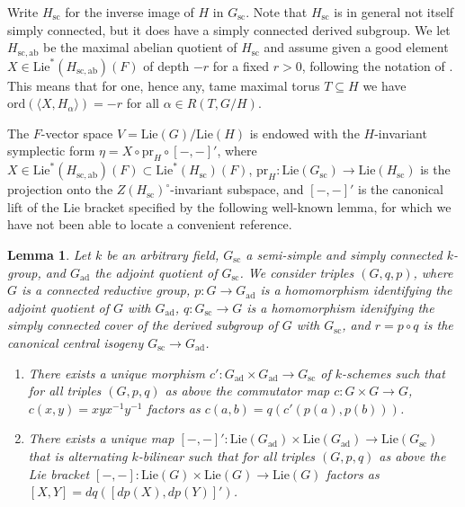 \documentclass{article}
\def\tx#1{\textrm{#1}}
\def\<{\langle}
\def\>{\rangle}
\newtheorem{lem}[thm]{Lemma}
\theoremstyle{definition}
\numberwithin{equation}{subsection}
\renewcommand{\-}{\hyp{}}
\begin{document}
Write $H_\mathrm{sc}$ for the inverse image of $H$ in $G_\tx{sc}$. Note that $H_\mathrm{sc}$ is in general not itself simply connected, but it does have a simply connected derived subgroup. We let $H_\mathrm{sc,ab}$ be the maximal abelian quotient of $H_\tx{sc}$ and assume given a good element $X \in \mathrm{Lie}^*(H_\mathrm{sc,ab})(F)$ of depth $-r$ for a fixed $r>0$, following the notation of \cite[\S3]{FKS23}. This means that for one, hence any, tame maximal torus $T \subseteq H$ we have $\tx{ord}(\<X,H_\alpha\>)=-r$ for all $\alpha \in R(T,G/H)$.

The $F$-vector space $V=\tx{Lie}(G)/\tx{Lie}(H)$ is endowed with the $H$-invariant symplectic form $\eta = X \circ \tx{pr}_H \circ [-,-]'$, where $X \in \mathrm{Lie}^*(H_\mathrm{sc,ab})(F) \subset \mathrm{Lie}^*(H_\mathrm{sc})(F)$, $\tx{pr}_H : \mathrm{Lie}(G_\mathrm{sc}) \to \mathrm{Lie}(H_\mathrm{sc})$ is the projection onto the $Z(H_\tx{sc})^\circ$-invariant subspace, and $[-,-]'$ is the canonical lift of the Lie bracket specified by the following  well-known lemma, for which we have not been able to locate a convenient reference.
\begin{lem}
	Let $k$ be an arbitrary field, $G_\mathrm{sc}$ a semi-simple and simply connected $k$-group, and $G_\mathrm{ad}$ the adjoint quotient of $G_\mathrm{sc}$. We consider triples $(G,q,p)$, where $G$ is a connected reductive group, $p : G \to G_\mathrm{ad}$ is a homomorphism identifying the adjoint quotient of $G$ with $G_\mathrm{ad}$, $q : G_\mathrm{sc} \to G$ is a homomorphism idenifying the simply connected cover of the derived subgroup of $G$ with $G_\mathrm{sc}$, and $r=p\circ q$ is the canonical central isogeny $G_\mathrm{sc} \to G_\mathrm{ad}$.
	\begin{enumerate}
		\item There exists a unique morphism $c' : G_\mathrm{ad} \times G_\mathrm{ad} \to G_\mathrm{sc}$ of $k$-schemes  such that for all triples $(G,p,q)$ as above
		the commutator map $c : G \times G \to G$, $c(x,y)=xyx^{-1}y^{-1}$ factors as $c(a,b)=q(c'(p(a),p(b)))$.
		\item There exists a unique map $[-,-]' : \mathrm{Lie}(G_\mathrm{ad}) \times \mathrm{Lie}(G_\mathrm{ad}) \to \mathrm{Lie}(G_\mathrm{sc})$ that is alternating $k$-bilinear such that for all triples $(G,p,q)$ as above the Lie bracket $[-,-] : \mathrm{Lie}(G) \times \mathrm{Lie}(G) \to \mathrm{Lie}(G)$ factors as $[X,Y]=dq([dp(X),dp(Y)]')$.
	\end{enumerate}
\end{lem}
\end{document}
